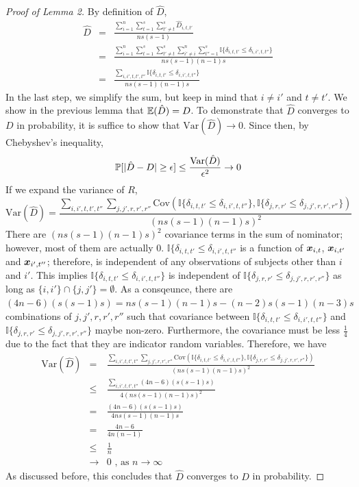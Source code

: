 \documentclass{article}
\begin{document}
\begin{proof}[Proof of Lemma 2]
	By definition of $\hat{D}$,
	\begin{eqnarray*}  
		\hat{D} &=&\frac{\sum\limits_{i=1}^{n} \sum\limits_{t=1}^{s}  \sum\limits_{t'\neq t}^{s} \hat{D}_{i,t,t'}}{ns(s-1)}\\
		&=& \frac{\sum\limits_{i=1}^{n} \sum\limits_{t=1}^{s}  \sum\limits_{t'\neq t}^{s}\sum\limits_{i' \neq i}^{n} \sum\limits_{t''=1}^{s} \mathbb{I}\{\delta_{i,t,t'} \leq \delta_{i,i',t,t''} \} }{ns(s-1)(n-1)s}\\
		&=& \frac{\sum\limits_{i,i',t,t',t''} \mathbb{I}\{\delta_{i,t,t'} \leq \delta_{i,i',t,t''} \}  }{ns(s-1)(n-1)s}
	\end{eqnarray*}
	In the last step, we simplify the sum, but keep in mind that $i\neq i'$ and $t \neq t'$. We show in the previous lemma that $\mathbb{E}(\hat{D})=D$. To demonstrate that $\hat{D}$ converges to $D$ in probability, it is suffice to show that $\text{Var}(\hat{D}) \rightarrow 0$. Since then, by Chebyshev's inequality,
	\[\mathbb{P}[|\hat{D}-D| \geq \epsilon] \leq \frac{\text{Var}(\hat{D})}{\epsilon^2} \rightarrow 0\]
	If we expand the variance of $R$, 
	\[\text{Var}(\hat{D})= \frac{\sum\limits_{i,i',t,t',t''} \sum\limits_{j,j',r,r',r''} \text{Cov}(\mathbb{I}\{\delta_{i,t,t'} \leq \delta_{i,i',t,t''} \},\mathbb{I}\{\delta_{j,r,r'} \leq \delta_{j,j',r,r',r''} \})}{(ns(s-1)(n-1)s)^2} \]
	There are $(ns(s-1)(n-1)s)^2$ covariance terms in the sum of nominator; however, most of them are actually $0$. $\mathbb{I}\{\delta_{i,t,t'} \leq \delta_{i,i',t,t''}$ is a function of $\boldsymbol{x}_{i,t}$, $\boldsymbol{x}_{i,t'}$ and $\boldsymbol{x}_{i',t''}$; therefore, is independent of any observations of subjects other than $i$ and $i'$. This implies $\mathbb{I}\{\delta_{i,t,t'} \leq \delta_{i,i',t,t''} \}$ is independent of $\mathbb{I}\{\delta_{j,r,r'} \leq \delta_{j,j',r,r',r''} \}$ as long as $\{i,i'\} \cap \{j,j'\} = \emptyset$. As a consqeunce, there are $(4n-6)(s(s-1)s)=ns(s-1)(n-1)s-(n-2)s(s-1)(n-3)s$ combinations of $j,j',r,r',r''$ such that covariance between $\mathbb{I}\{\delta_{i,t,t'} \leq \delta_{i,i',t,t''} \}$ and $\mathbb{I}\{\delta_{j,r,r'} \leq \delta_{j,j',r,r',r''} \}$ maybe non-zero. Furthermore, the covariance must be less $\frac{1}{4}$ due to the fact that they are indicator random variables. Therefore, we have 
	\begin{eqnarray*} 
		\text{Var}(\hat{D})&=& \frac{\sum\limits_{i,i',t,t',t''} \sum\limits_{j,j',r,r',r''} \text{Cov}(\mathbb{I}\{\delta_{i,t,t'} \leq \delta_{i,i',t,t''} \},\mathbb{I}\{\delta_{j,r,r'} \leq \delta_{j,j',r,r',r''} \})}{(ns(s-1)(n-1)s)^2} \\
		&\leq& \frac{\sum\limits_{i,i',t,t',t''}  (4n-6)(s(s-1)s)}{4(ns(s-1)(n-1)s)^2} \\
		&=& \frac{ (4n-6)(s(s-1)s)}{4ns(s-1)(n-1)s} \\
		&=& \frac{4n-6}{4n(n-1)} \\
		&\leq& \frac{1}{n}  \\
		&\rightarrow& 0 \text{ , as $n\rightarrow \infty$} 
	\end{eqnarray*}
	As discussed before, this concludes that $\hat{D}$ converges to $D$ in probability. 
\end{proof}
\end{document}
